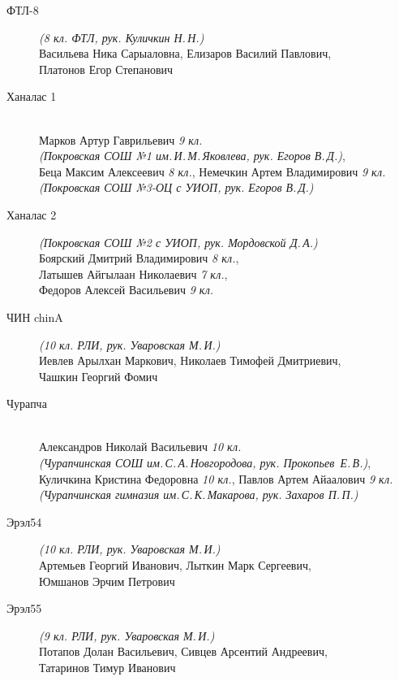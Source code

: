 \begin{description}
\item[ФТЛ-8] \textit{(8 кл. ФТЛ, рук. Куличкин Н.\,Н.)} \\
Васильева Ника Сарыаловна, Елизаров Василий Павлович, \\
Платонов Егор Степанович

\item[Ханалас 1] ~ \\
Марков Артур Гаврильевич \textit{9 кл. \\
(Покровская СОШ №1 им.\,И.\,М.\,Яковлева, рук. Егоров В.\,Д.)}, \\
Беца Максим Алексеевич \textit{8 кл.}, Немечкин Артем Владимирович \textit{9 кл.} \\
\textit{(Покровская СОШ №3-ОЦ с УИОП, рук. Егоров В.\,Д.)}

\item[Ханалас 2] \textit{(Покровская СОШ №2 с УИОП, рук. Мордовской Д.\,А.)} \\
Боярский Дмитрий Владимирович \textit{8 кл.}, \\
Латышев Айгылаан Николаевич \textit{7 кл.}, \\
Федоров Алексей Васильевич \textit{9 кл.}

\item[ЧИН chinA] \textit{(10 кл. РЛИ, рук. Уваровская М.\,И.)} \\
Иевлев Арылхан Маркович, Николаев Тимофей Дмитриевич, \\
Чашкин Георгий Фомич

\item[Чурапча] ~ \\
Александров Николай Васильевич \textit{10 кл. \\
(Чурапчинская СОШ им.\,С.\,А.\,Новгородова, рук. Прокопьев~Е.\,В.)}, \\
Куличкина Кристина Федоровна \textit{10 кл.}, Павлов Артем Айаалович \textit{9 кл. \\
(Чурапчинская гимназия им.\,С.\,К.\,Макарова, рук. Захаров П.\,П.)}

\item[Эрэл54] \textit{(10 кл. РЛИ, рук. Уваровская М.\,И.)} \\
Артемьев Георгий Иванович, Лыткин Марк Сергеевич, \\
Юмшанов Эрчим Петрович

\item[Эрэл55] \textit{(9 кл. РЛИ, рук. Уваровская М.\,И.)} \\
Потапов Долан Васильевич, Сивцев Арсентий Андреевич, \\
Татаринов Тимур Иванович


\end{description}
